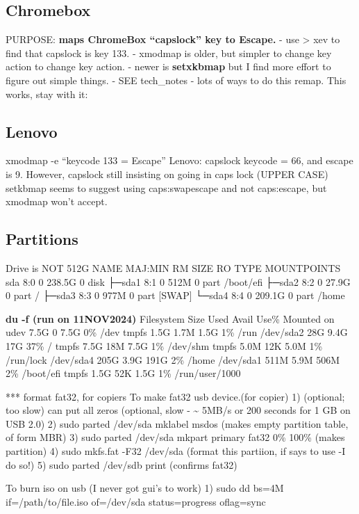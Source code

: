 \documentclass[
]{report}
\begin{document}
\subsection{Chromebox}\label{chromebox}

PURPOSE: \textbf{maps ChromeBox ``capslock'' key to Escape.} - use
\textgreater{} xev to find that capslock is key 133. - xmodmap is older,
but simpler to change key action to change key action. - newer is
\textbf{setxkbmap} but I find more effort to figure out simple things. -
SEE tech\_notes - lots of ways to do this remap. This works, stay with
it:

\subsection{Lenovo}\label{lenovo}

xmodmap -e ``keycode 133 = Escape'' Lenovo: capslock keycode = 66, and
escape is 9. However, capslock still insisting on going in caps lock
(UPPER CASE) setkbmap seems to suggest using caps:swapescape and not
caps:escape, but xmodmap won't accept.

\subsection{Partitions}\label{partitions}

Drive is NOT 512G NAME MAJ:MIN RM SIZE RO TYPE MOUNTPOINTS sda 8:0 0
238.5G 0 disk ├─sda1 8:1 0 512M 0 part /boot/efi ├─sda2 8:2 0 27.9G 0
part / ├─sda3 8:3 0 977M 0 part {[}SWAP{]} └─sda4 8:4 0 209.1G 0 part
/home

\textbf{du -f (run on 11NOV2024)} Filesystem Size Used Avail Use\%
Mounted on udev 7.5G 0 7.5G 0\% /dev tmpfs 1.5G 1.7M 1.5G 1\% /run
/dev/sda2 28G 9.4G 17G 37\% / tmpfs 7.5G 18M 7.5G 1\% /dev/shm tmpfs
5.0M 12K 5.0M 1\% /run/lock /dev/sda4 205G 3.9G 191G 2\% /home /dev/sda1
511M 5.9M 506M 2\% /boot/efi tmpfs 1.5G 52K 1.5G 1\% /run/user/1000

*** format fat32, for copiers To make fat32 usb device.(for copier) 1)
(optional; too slow) can put all zeros (optional, slow -
\textasciitilde{} 5MB/s or 200 seconds for 1 GB on USB 2.0) 2) sudo
parted /dev/sda mklabel msdos (makes empty partition table, of form MBR)
3) sudo parted /dev/sda mkpart primary fat32 0\% 100\% (makes partition)
4) sudo mkfs.fat -F32 /dev/sda (format this partiion, if says to use -I
do so!) 5) sudo parted /dev/sdb print (confirms fat32)

To burn iso on usb (I never got gui's to work) 1) sudo dd bs=4M
if=/path/to/file.iso of=/dev/sda status=progress oflag=sync
\end{document}

